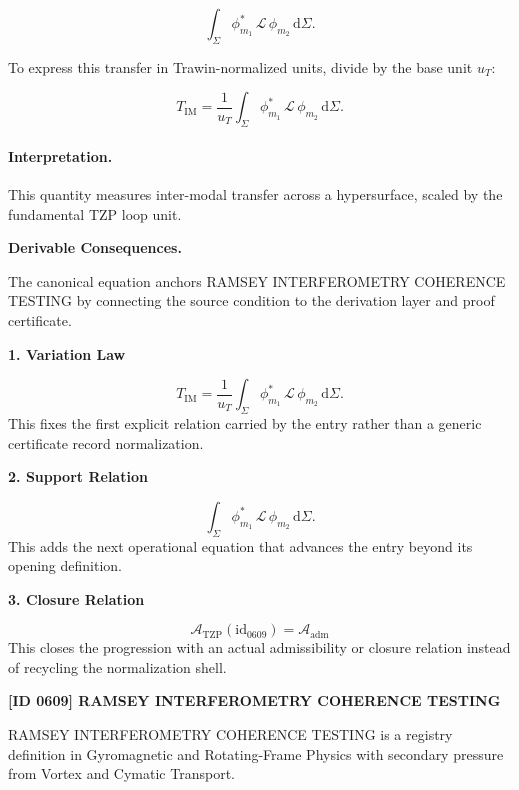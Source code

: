 \begin{equation}
\int_{\Sigma}
\phi_{m_1}^{*}
\,\mathcal{L}\,
\phi_{m_2}
\,\mathrm{d}\Sigma .
\end{equation}

To express this transfer in Trawin-normalized units, divide by the base unit $u_T$:

\begin{equation}
T_{\mathrm{IM}}
=
\frac{1}{u_T}
\int_{\Sigma}
\phi_{m_1}^{*}
\,\mathcal{L}\,
\phi_{m_2}
\,\mathrm{d}\Sigma .
\end{equation}

\paragraph{Interpretation.}
This quantity measures inter-modal transfer across a hypersurface, scaled by the fundamental TZP loop unit.

\par\vspace{0.35em}
\noindent\textbf{Derivable Consequences.}\quad
\begingroup
\footnotesize
\raggedright
The canonical equation anchors RAMSEY INTERFEROMETRY COHERENCE TESTING by connecting the source condition to the derivation layer and proof certificate.
\par\endgroup

\noindent\textbf{1. Variation Law}\par
\[
T_{\mathrm{IM}} = \frac{1}{u_T} \int_{\Sigma} \phi_{m_1}^{*} \,\mathcal{L}\, \phi_{m_2} \,\mathrm{d}\Sigma.
\]
\noindent This fixes the first explicit relation carried by the entry rather than a generic certificate record normalization.\par
\noindent\textbf{2. Support Relation}\par
\[
\int_{\Sigma} \phi_{m_1}^{*} \,\mathcal{L}\, \phi_{m_2} \,\mathrm{d}\Sigma.
\]
\noindent This adds the next operational equation that advances the entry beyond its opening definition.\par
\noindent\textbf{3. Closure Relation}\par
\[
\mathcal{A}_{\mathrm{TZP}}(\mathrm{id}_{0609})=\mathcal{A}_{\mathrm{adm}}
\]
\noindent This closes the progression with an actual admissibility or closure relation instead of recycling the normalization shell.\par

\clearpage
\noindent\textbf{[ID 0609] RAMSEY INTERFEROMETRY COHERENCE TESTING}\par
\vspace{0.35em}
\begingroup\small
{}
RAMSEY INTERFEROMETRY COHERENCE TESTING is a registry definition in Gyromagnetic and Rotating-Frame Physics with secondary pressure from Vortex and Cymatic Transport.

